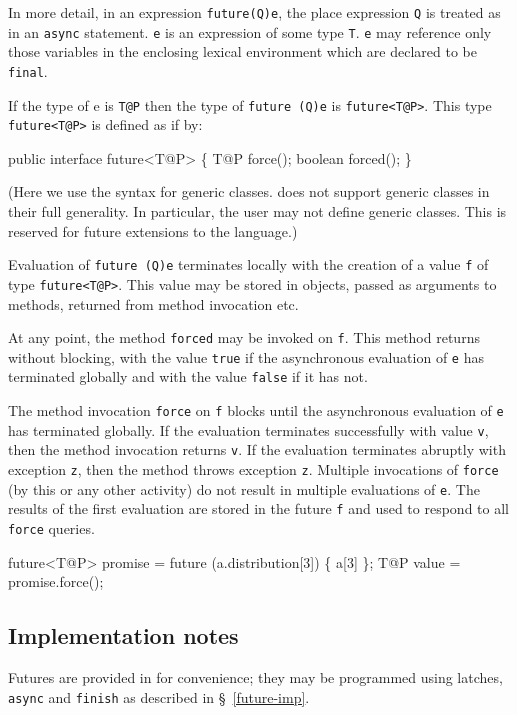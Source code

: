 In more detail, in an expression {\tt future(Q){e}}, the place
expression {\tt Q} is treated as in an {\tt async} statement. {\tt e}
is an expression of some type {\tt T}. {\tt e} may reference only
those variables in the enclosing lexical environment which are
declared to be {\tt final}.

If the type of {\cf e} is {\tt T@P} then the type of
{\tt future (Q){e}} is {\tt future<T@P>}.  This 
type {\tt future<T@P>} is defined as if by:
\begin{x10}
public interface future<T@P> \{
  T@P force();
  boolean forced();
\}
\end{x10}

(Here we use the syntax for generic classes. \XtenCurrVer{} does not support
generic classes in their full generality. In particular, the user may
not define generic classes. This is reserved for future extensions to the
language.)

Evaluation of {\tt future (Q){e}} terminates locally with the creation
of a value {\tt f} of type {\tt future<T@P>}.  This value may be
stored in objects, passed as arguments to methods, returned from
method invocation etc. 

At any point, the method {\tt forced} may be invoked on {\tt f}. This
method returns without blocking, with the value {\tt true} if the
asynchronous evaluation of {\tt e} has terminated globally and with
the value {\tt false} if it has not.

The method invocation {\tt force} on {\tt f} blocks until the
asynchronous evaluation of {\tt e} has terminated globally. If the
evaluation terminates successfully with value {\tt v}, then the method
invocation returns {\tt v}. If the evaluation terminates abruptly with
exception {\tt z}, then the method throws exception {\tt z}. Multiple
invocations of {\tt force} (by this or any other activity) do not
result in multiple evaluations of {\tt e}. The results of the first
evaluation are stored in the future {\tt f} and used to respond to all
{\tt force} queries.

\begin{x10}
future<T@P> promise 
     = future (a.distribution[3]) \{ a[3] \};
T@P value = promise.force();
\end{x10}

\subsection{Implementation notes}
Futures are provided in \Xten{} for convenience; they may be
programmed using latches, {\tt async} and {\tt finish} as
described in \S~\ref{future-imp}.

